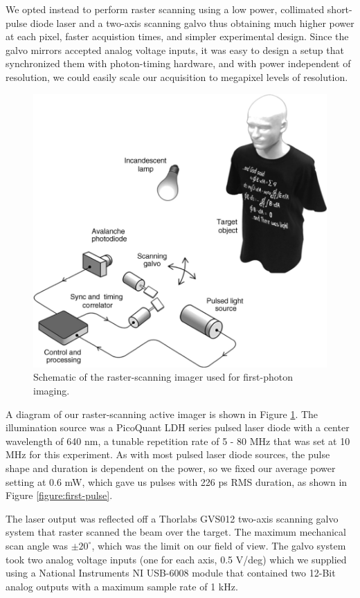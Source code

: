 We opted instead to perform raster scanning using a low power, collimated short-pulse diode laser and a two-axis scanning galvo thus obtaining much higher power at each pixel, faster acquistion times, and simpler experimental design. Since the galvo mirrors accepted analog voltage inputs, it was easy to design a setup that synchronized them with photon-timing hardware, and with power independent of resolution, we could easily scale our acquisition to megapixel levels of resolution.

\begin{figure}[htb]
\centerline{\includegraphics[width=14cm]{figure-first-setup.pdf}}
\caption{Schematic of the raster-scanning imager used for first-photon imaging.}
\label{figure:first-setup}
\end{figure}

A diagram of our raster-scanning active imager is shown in Figure \ref{figure:first-setup}. The illumination source was a PicoQuant LDH series pulsed laser diode with a center wavelength of 640 nm, a tunable repetition rate of 5 - 80 MHz that was set at 10 MHz for this experiment. As with most pulsed laser diode sources, the pulse shape and duration is dependent on the power, so we fixed our average power setting at 0.6 mW, which gave us pulses with 226 ps RMS duration, as shown in Figure \ref{figure:first-pulse}.

The laser output was reflected off a Thorlabs GVS012 two-axis scanning galvo system that raster scanned the beam over the target. The maximum mechanical scan angle was $\pm 20^\circ$, which was the limit on our field of view. The galvo system took two analog voltage inputs (one for each axis, 0.5 V/deg) which we supplied using a National Instruments NI USB-6008 module that contained two 12-Bit analog outputs with a maximum sample rate of 1 kHz.


